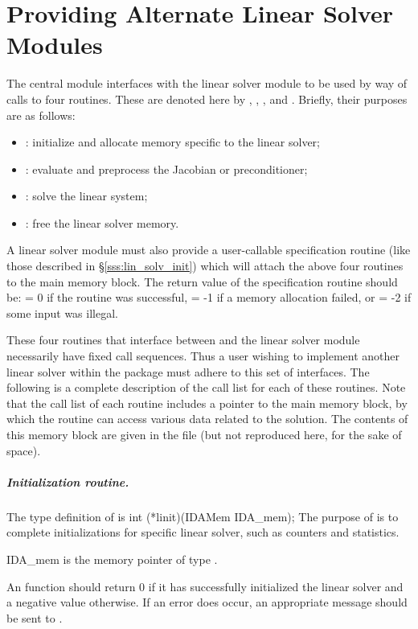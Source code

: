 \chapter{Providing Alternate Linear Solver Modules}\label{s:new_linsolv}
The central {\ida} module interfaces with the linear solver module to be
used by way of calls to four routines.  These are denoted here by 
, , , and .
Briefly, their purposes are as follows:
\begin{itemize}
\item {}: initialize and allocate memory specific to the
  linear solver;
\item {}: evaluate and preprocess the Jacobian or preconditioner;
\item {}: solve the linear system;
\item {}: free the linear solver memory.
\end{itemize}
A linear solver module must also provide a user-callable specification routine
(like those described in \S\ref{sss:lin_solv_init}) which will attach the above four 
routines to the main {\ida} memory block. The return value of the specification 
routine should be:  = 0 if the routine was successful,
 = -1 if a memory allocation failed, or  = -2
if some input was illegal.

These four routines that interface between {\ida} and the linear solver module
necessarily have fixed call sequences.  Thus a user wishing to implement another 
linear solver within the {\ida} package must adhere to this set of interfaces.
The following is a complete description of the call list for each of
these routines.  Note that the call list of each routine includes a
pointer to the main {\ida} memory block, by which the routine can access
various data related to the {\ida} solution.  The contents of this memory
block are given in the file  (but not reproduced here, for
the sake of space).


\paragraph{Initialization routine.}
The type definition of  is
{
  int (*linit)(IDAMem IDA\_mem);
}
{
  The purpose of  is to complete initializations for      
  specific linear solver, such as counters and statistics.        
}
{
  \begin{args}
  \item[IDA\_mem]
    is the {\ida} memory pointer of type .
  \end{args}
}
{
  An  function should return $0$ if it 
  has successfully initialized the {\cvode} linear solver and 
  a negative value otherwise. 
}
{
  If an error does occur, an appropriate message should be sent 
  to .
}

